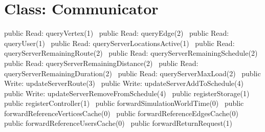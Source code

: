 \section*{Class: Communicator}
\nwenddocs{}\endmoddef{}
public \LA{}Read: queryVertex(1)~{\nwtagstyle{}}\RA{}
public \LA{}Read: queryEdge(2)~{\nwtagstyle{}}\RA{}
public \LA{}Read: queryUser(1)~{\nwtagstyle{}}\RA{}
public \LA{}Read: queryServerLocationsActive(1)~{\nwtagstyle{}}\RA{}
public \LA{}Read: queryServerRemainingRoute(2)~{\nwtagstyle{}}\RA{}
public \LA{}Read: queryServerRemainingSchedule(2)~{\nwtagstyle{}}\RA{}
public \LA{}Read: queryServerRemainingDistance(2)~{\nwtagstyle{}}\RA{}
public \LA{}Read: queryServerRemainingDuration(2)~{\nwtagstyle{}}\RA{}
public \LA{}Read: queryServerMaxLoad(2)~{\nwtagstyle{}}\RA{}
\nwendcode{}\nwdocspar
{}
\nwenddocs{}\plusendmoddef
public \LA{}Write: updateServerRoute(3)~{\nwtagstyle{}}\RA{}
public \LA{}Write: updateServerAddToSchedule(4)~{\nwtagstyle{}}\RA{}
public \LA{}Write: updateServerRemoveFromSchedule(4)~{\nwtagstyle{}}\RA{}
\nwendcode{}\nwdocspar
{}
\nwenddocs{}\plusendmoddef
public \LA{}registerStorage(1)~{\nwtagstyle{}}\RA{}
public \LA{}registerController(1)~{\nwtagstyle{}}\RA{}
public \LA{}forwardSimulationWorldTime(0)~{\nwtagstyle{}}\RA{}
public \LA{}forwardReferenceVerticesCache(0)~{\nwtagstyle{}}\RA{}
public \LA{}forwardReferenceEdgesCache(0)~{\nwtagstyle{}}\RA{}
public \LA{}forwardReferenceUsersCache(0)~{\nwtagstyle{}}\RA{}
public \LA{}forwardReturnRequest(1)~{\nwtagstyle{}}\RA{}
\nwendcode{}\nwdocspar


